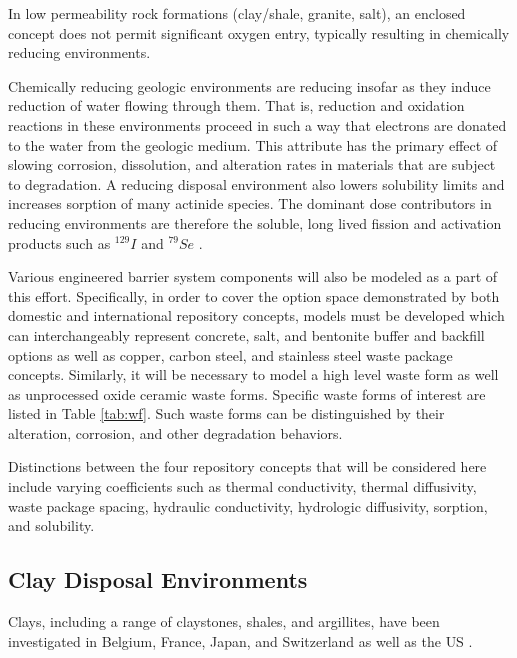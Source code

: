 In low permeability rock formations (clay/shale, granite, salt), an enclosed 
concept does not permit significant oxygen entry, typically resulting in 
chemically reducing environments.

Chemically reducing geologic environments are reducing insofar as they induce 
reduction of water flowing through them. That is, reduction and oxidation 
reactions in these environments proceed in such a way that electrons are 
donated to the water from the geologic medium. This attribute has the primary 
effect of slowing corrosion, dissolution, and  alteration rates in materials 
that are subject to degradation. A reducing disposal environment also lowers 
solubility limits and increases sorption of many actinide species. The dominant 
dose contributors in reducing environments are therefore the soluble, long 
lived fission and activation products such as $^{129}I$ and $^{79}Se$ 
\cite{oecd_nuclear_energy_agency_advanced_2006, von_lensa_red-impact_2008}.  

Various engineered barrier system components will also be modeled as a part of 
this effort.  Specifically, in order to cover the option space demonstrated by 
both domestic and international repository concepts, models must be developed 
which can interchangeably represent concrete, salt, and bentonite buffer and 
backfill options as well as copper, carbon steel, and stainless steel waste 
package concepts. Similarly, it will be necessary to model a high level waste 
form as well as unprocessed oxide ceramic waste forms. Specific waste forms of 
interest are listed in Table \ref{tab:wf}. Such waste forms can be distinguished 
by their alteration, corrosion, and other degradation behaviors.


Distinctions between the four repository concepts that will be considered here 
include varying coefficients such as thermal conductivity, thermal diffusivity, 
waste package spacing,  hydraulic conductivity,  hydrologic diffusivity, 
sorption, and solubility.

\subsection{Clay Disposal Environments}

Clays, including a range of claystones, shales, and argillites, have been 
investigated in Belgium, France, Japan, and Switzerland 
\cite{von_lensa_red-impact_2008} as well as the  \gls{US} 
\cite{clayton_generic_2011}. 

